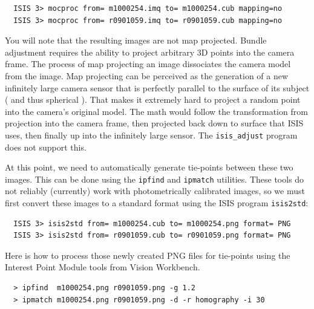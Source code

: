 \begin{verbatim}
  ISIS 3> mocproc from= m1000254.imq to= m1000254.cub mapping=no
  ISIS 3> mocproc from= r0901059.imq to= r0901059.cub mapping=no
\end{verbatim}

You will note that the resulting images are not map projected. Bundle
adjustment requires the ability to project arbitrary 3D points into
the camera frame. The process of map projecting an image dissociates
the camera model from the image. Map projecting can be perceived as
the generation of a new infinitely large camera sensor that is
perfectly parallel to the surface of its subject ( and thus spherical
). That makes it extremely hard to project a random point into
the camera's original model. The math would follow the transformation from
projection into the camera frame, then projected back down to surface
that ISIS uses, then finally up into the infinitely large sensor. The
\texttt{isis\_adjust} program does not support this.

At this point, we need to automatically generate tie-points between
these two images. This can be done using the \texttt{ipfind} and
\texttt{ipmatch} utilities. These tools do not reliably (currently)
work with photometrically calibrated images, so we must first convert
these images to a standard format using the \ac{ISIS} program
\texttt{isis2std}:

\begin{verbatim}
  ISIS 3> isis2std from= m1000254.cub to= m1000254.png format= PNG
  ISIS 3> isis2std from= r0901059.cub to= r0901059.png format= PNG
\end{verbatim}

Here is how to process those newly created PNG files for tie-points
using the Interest Point Module tools from Vision Workbench.

\begin{verbatim}
  > ipfind  m1000254.png r0901059.png -g 1.2
  > ipmatch m1000254.png r0901059.png -d -r homography -i 30
\end{verbatim}

\begin{center}
\end{center}

